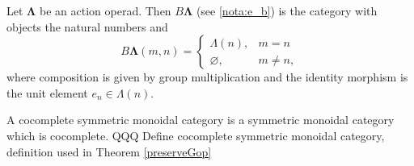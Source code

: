\documentclass{amsbook} %
\newcommand{\mb}{\mathbf}
\numberwithin{section}{chapter}
\begin{document}
\begin{Defi}\label{Defi:actop_to_cat}
Let $\mb{\Lambda}$ be an action operad.  Then $B\mb{\Lambda}$ (see \cref{nota:e_b}) is the category with objects the natural numbers and
\[
B\mb{\Lambda}(m,n) = \left\{ \begin{array}{lc}
\Lambda(n), & m = n \\
\varnothing, & m \neq n,
\end{array} \right.
\]
where composition is given by group multiplication and the identity morphism is the unit element $e_n \in \Lambda(n)$.
\end{Defi}

\begin{Defi}\label{cocom_symm_mon_cat}
A cocomplete symmetric monoidal category is a symmetric monoidal category which is cocomplete.
QQQ Define cocomplete symmetric monoidal category, definition used in Theorem \ref{preserveGop}
\end{Defi}
\end{document}
